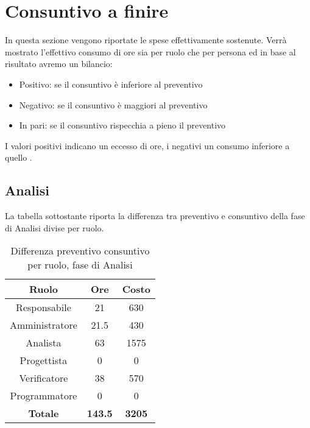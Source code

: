 \section{Consuntivo a finire}
In questa sezione vengono riportate le spese effettivamente sostenute. Verrà mostrato l’effettivo consumo di ore sia per ruolo che per persona ed in base al risultato avremo un bilancio:
\begin{itemize}
	\item Positivo: se il consuntivo è inferiore al preventivo
	\item Negativo: se il consuntivo è maggiori al preventivo
	\item In pari: se il consuntivo rispecchia a pieno il preventivo
\end{itemize}
I valori positivi indicano un eccesso di ore, i negativi un consumo inferiore a quello .

\subsection{Analisi}
La tabella sottostante riporta la differenza tra preventivo e consuntivo della fase di Analisi divise per ruolo.
\begin{table}[H]
	\centering
	\begin{tabular}{|c|c|c|}
		\hline
		\textbf{Ruolo} &
		\textbf{Ore} &
		\textbf{Costo} \\
		\hline
		Responsabile & 21 & 630\\
		\hline
		Amministratore & 21.5 & 430\\
		\hline
		Analista & 63 & 1575\\
		\hline
		Progettista & 0 & 0 \\
		\hline
		Verificatore & 38 & 570\\
		\hline
		Programmatore & 0 & 0 \\
		\hline
		\textbf{Totale} & \textbf{143.5} & \textbf{3205} \\
		\hline
	\end{tabular}
	\caption{Differenza preventivo consuntivo per ruolo, fase di Analisi}
\end{table}

